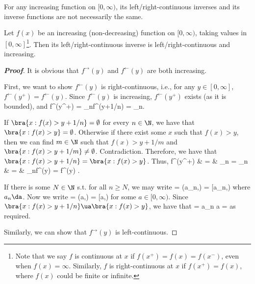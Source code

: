 \begin{remark}
For any increasing function on $[0,\infty)$, its left/right-continuous inverses and its inverse functions are not necessarily the same.
\end{remark}

\begin{proposition}\label{pro:left_right_continuous_inverse_continuity}
Let $f(x)$ be an increasing (non-decreasing) function on $[0,\infty)$, taking values in $[0,\infty]$\footnote{Note that we say $f$ is continuous at $x$ if $f(x^+) = f(x) = f(x^-)$, even when $f(x) = \infty$. Similarly, $f$ is right-continuous at $x$ if $f(x^+) = f(x)$, where $f(x)$ could be finite or infinite.}. Then its left/right-continuous inverse is left/right-continuous and increasing.
\end{proposition}

\begin{proof}[\bf Proof]
It is obvious that $f^{\to}(y)$ and $f^{\gets}(y)$ are both increasing.

First, we want to show $f^{\gets}(y)$ is right-continuous, i.e., for any $y\in [0,\infty]$, $f^{\gets}(y^+) = f^{\gets}(y)$. Since $f^{\gets}(y)$ is increasing, $f^{\gets}(y^+)$ exists (as it is bounded), and
\be
f^{\gets}(y^+) = \lim_{n\to \infty}f^{\gets}(y+1/n) = \lim_{n\to\infty}\inf{}.
\ee

If $\bra{x:f(x)>y+1/n}=\emptyset$ for every $n\in \N$, we have that $\bra{x:f(x)>y}=\emptyset$. Otherwise if there exist some $x$ such that $f(x)>y$, then we can find $m\in \N$ such that $f(x)>y+1/m$ and $\bra{x:f(x)>y+1/m}\neq\emptyset$. Contradiction. Therefore, we have that $\bra{x:f(x)>y+1/n}=\bra{x:f(x)>y}$. Thus,
\beast
f^{\gets}(y^+) & = & \lim_{n\to\infty}\inf{} = \lim_{n\to\infty} \inf{} \\
& = & \lim_{n\to\infty}f^{\gets}(y) = f^{\gets}(y) .
\eeast

If there is some $N\in \N$ s.t. for all $n\geq N$, we may write
\be
{} = (a_n,\infty)\quad {}\quad {} = [a_n,\infty)
\ee
where $a_n\da$. Now we write
\be
{} = (a,\infty)\quad {}\quad {} = [a,\infty)
\ee
for some $a\in [0,\infty)$. Since $\bra{x:f(x)>y+1/n} \ua \bra{x:f(x)>y}$, we have that
\be
\inf{} = a_n \to a = \inf{}
\ee
as required.

Similarly, we can show that $f^{\to}(y)$ is left-continuous.
\end{proof}


